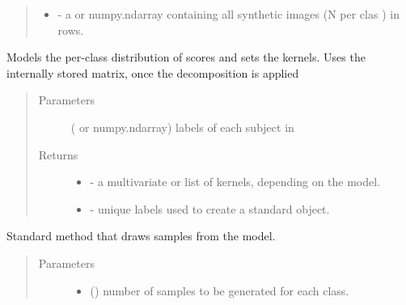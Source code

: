 \documentclass[letterpaper,10pt,english]{sphinxmanual}
\begin{document}
\begin{fulllineitems}
\begin{fulllineitems}
\begin{quote}
\begin{description}
\begin{itemize}
\item {} 
 - a  or numpy.ndarray containing all synthetic             images (N per clas ) in rows.

\end{itemize}


\end{description}\end{quote}

\end{fulllineitems}


\begin{fulllineitems}
\label{\detokenize{api:brainSimulator.BrainSimulator.model}}
Models the per-class distribution of scores and sets the kernels. Uses
the internally stored  matrix, once the decomposition is applied
\begin{quote}\begin{description}
\item[{Parameters}] \leavevmode
{} ( or numpy.ndarray) \textendash{} labels of each subject in 

\item[{Returns}] \leavevmode
\begin{itemize}
\item {} 
 - a multivariate  or list of kernels,             depending on the model.

\item {} 
 - unique labels used to create a standard object.

\end{itemize}


\end{description}\end{quote}

\end{fulllineitems}


\begin{fulllineitems}
\label{\detokenize{api:brainSimulator.BrainSimulator.sample}}
Standard method that draws samples from the model.
\begin{quote}\begin{description}
\item[{Parameters}] \leavevmode\begin{itemize}
\item {} 
 () \textendash{} number of samples to be generated for each class.


\end{itemize}
\end{description}
\end{quote}
\end{fulllineitems}
\end{fulllineitems}
\end{document}
